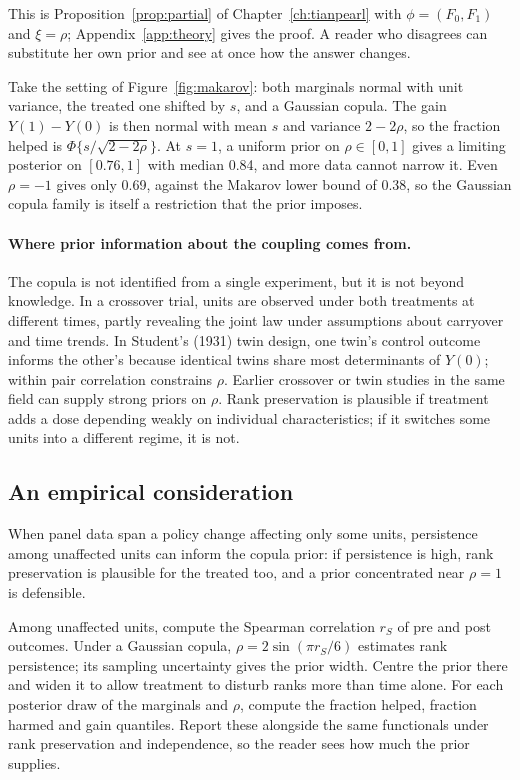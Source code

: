 This is Proposition~\ref{prop:partial} of Chapter~\ref{ch:tianpearl} with $\phi = (F_0, F_1)$ and $\xi = \rho$; Appendix~\ref{app:theory} gives the proof. A reader who disagrees can substitute her own prior and see at once how the answer changes.

Take the setting of Figure~\ref{fig:makarov}: both marginals normal with unit variance, the treated one shifted by $s$, and a Gaussian copula. The gain $Y(1) - Y(0)$ is then normal with mean $s$ and variance $2 - 2\rho$, so the fraction helped is $\Phi\{s/\sqrt{2 - 2\rho}\}$. At $s = 1$, a uniform prior on $\rho \in [0, 1]$ gives a limiting posterior on $[0.76, 1]$ with median 0.84, and more data cannot narrow it. Even $\rho = -1$ gives only 0.69, against the Makarov lower bound of 0.38, so the Gaussian copula family is itself a restriction that the prior imposes.

\paragraph{Where prior information about the coupling comes from.} The copula is not identified from a single experiment, but it is not beyond knowledge. In a crossover trial, units are observed under both treatments at different times, partly revealing the joint law under assumptions about carryover and time trends. In Student's (1931) twin design, one twin's control outcome informs the other's because identical twins share most determinants of $Y(0)$; within pair correlation constrains $\rho$. Earlier crossover or twin studies in the same field can supply strong priors on $\rho$. Rank preservation is plausible if treatment adds a dose depending weakly on individual characteristics; if it switches some units into a different regime, it is not.

\subsection{An empirical consideration}

When panel data span a policy change affecting only some units, persistence among unaffected units can inform the copula prior: if persistence is high, rank preservation is plausible for the treated too, and a prior concentrated near $\rho = 1$ is defensible.

Among unaffected units, compute the Spearman correlation $r_S$ of pre and post outcomes. Under a Gaussian copula, $\rho = 2\sin(\pi r_S/6)$ estimates rank persistence; its sampling uncertainty gives the prior width. Centre the prior there and widen it to allow treatment to disturb ranks more than time alone. For each posterior draw of the marginals and $\rho$, compute the fraction helped, fraction harmed and gain quantiles. Report these alongside the same functionals under rank preservation and independence, so the reader sees how much the prior supplies.

